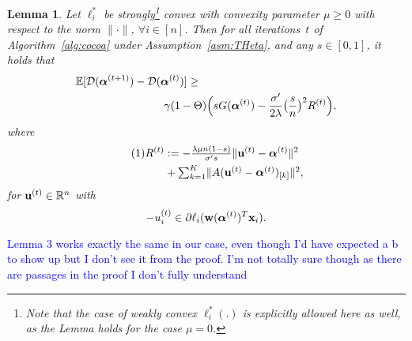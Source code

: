 \documentclass{article}
\newcommand{\Exp}{\mathbb{E}}                      %
\newcommand\tagthis{\addtocounter{equation}{1}\tag{\theequation}}
\newcommand{\R}{\mathbb{R}}                      %
\newcommand{\xv}{ {\bf x}}
\newcommand{\uv}{ {\bf u}}
\newcommand{\wv}{ {\bf w}}
\newcommand{\alphav}{ {\boldsymbol \alpha}}
\newcommand{\0}{ {\bf 0}}
\newcommand{\vsubset}[2]{#1_{[#2]}}
\newcommand{\vc}[2]{#1^{(#2)}}                   %
\newcommand{\bD}{\mathcal{D}}
\theoremstyle{plain}
\newtheorem{lemma}[theorem]{Lemma}
\theoremstyle{definition}
\begin{document}
\begin{lemma}
\label{lem:basicLemma}
Let $\ell_i^*$ be strongly\footnote{%
Note that the case of weakly convex $\ell_i^*(.)$ is explicitly allowed here as well, as the Lemma holds for the case $\mu = 0$.
} %
convex with convexity parameter
$\mu \geq 0$ with respect to the norm $\|\cdot\|$, $\forall i\in[n]$.
Then for all iterations~$t$ of Algorithm~\ref{alg:cocoa} under Assumption~\ref{asm:THeta}, and any $s\in [0,1]$, it holds that
\begin{align}
\label{eq:lemma:dualDecrease_VS_dualityGap}
&\Exp[
\bD(\vc{\alphav}{t+1})
-
\bD(\vc{\alphav}{t})
 ]
\geq
\\ \nonumber
&\qquad\qquad\qquad\qquad
\gamma
(1-\Theta)
 \Big(
 s G(\vc{\alphav}{t})
-
\frac{\sigma'}{2\lambda }
\big(\frac sn \big)^2
\vc{R}{t}
 \Big), \vspace{-2mm}
\end{align}
where\vspace{-2mm}
\begin{align*}
\tagthis \label{eq:defOfR}
\vc{R}{t}&:=
-
\tfrac{ \lambda\mu n (1-s)}{\sigma' s }
 \|\vc{\uv}{t}-\vc{\alphav}{t}\|^2 
\\ \qquad \nonumber &+ 
\textstyle{\sum}_{k=1}^K   
  \| A \vsubset{  (\vc{\uv}{t}  - \vc{\alphav}{t} )}{k}\|^2,
\end{align*}
for $\vc{\uv}{t} \in\R^n$
with \vspace{-1mm}
\begin{equation}
\label{eq:defintionOfUi}
-\vc{u_i}{t}
 \in \partial \ell_i(\wv(\vc{\alphav}{t})^T \xv_i).
\end{equation}
\end{lemma}

\textcolor{blue}{Lemma 3 works exactly the same in our case, even though I'd have expected a b to show up but I
don't see it from the proof. I'm not totally sure though as there are passages in the proof I don't fully understand}
\end{document}

